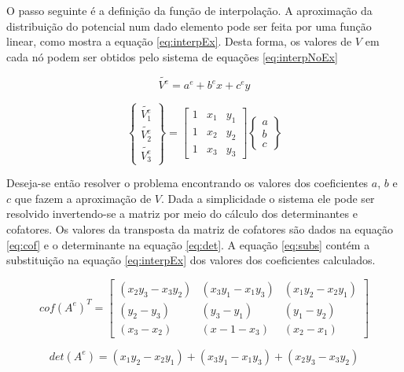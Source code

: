 \documentclass[
    12pt,               %
    openright,          %
    oneside,
    a4paper,            %
    english,            %
    french,             %
    spanish,            %
    brazil              %
    ]{abntex2}
\begin{document}
O passo seguinte é a definição da função de interpolação. A aproximação da distribuição do potencial num dado elemento pode ser feita por uma função linear, como mostra a equação \ref{eq:interpEx}. Desta forma, os valores de $V$ em cada nó podem ser obtidos pelo sistema de equações \ref{eq:interpNoEx}

\begin{equation}
\label{eq:interpEx}
\tilde{V^e} = a^e + b^e x + c^e y
\end{equation}

\begin{equation}
\label{eq:interpNoEx}
\begin{Bmatrix}
\tilde{V^e_1}  \\
\tilde{V^e_2} \\
\tilde{V^e_3}
\end{Bmatrix}
=
\begin{bmatrix}
1 & x_1 & y_1 \\
1 & x_2 & y_2 \\
1 & x_3 & y_3
\end{bmatrix}
\begin{Bmatrix}
a \\
b \\
c
\end{Bmatrix}
\end{equation}

Deseja-se então resolver o problema encontrando os valores dos coeficientes $a$, $b$ e $c$ que fazem a aproximação de $V$. Dada a simplicidade o sistema ele pode ser resolvido invertendo-se a matriz por meio do cálculo dos determinantes e cofatores. Os valores da transposta da matriz de cofatores são dados na equação \ref{eq:cof} e o determinante na equação \ref{eq:det}. A equação \ref{eq:subs} contém a substituição na equação \ref{eq:interpEx} dos valores dos coeficientes calculados.

\begin{equation}
\label{eq:cof}
cof(A^e)^T
=
\begin{bmatrix}
(x_2y_3 - x_3y_2) & (x_3y_1 - x_1y_3) & (x_1y_2 - x_2y_1) \\
(y_2 - y_3) & (y_3 - y_1) & (y_1 - y_2) \\
(x_3 - x_2) & (x-1 - x_3) & (x_2 - x_1)
\end{bmatrix}
\end{equation}

\begin{equation}
\label{eq:det}
det(A^e)
=
(x_1y_2 - x_2y_1)+
(x_3y_1 - x_1y_3)+
(x_2y_3 - x_3y_2)
\end{equation}
\end{document}

